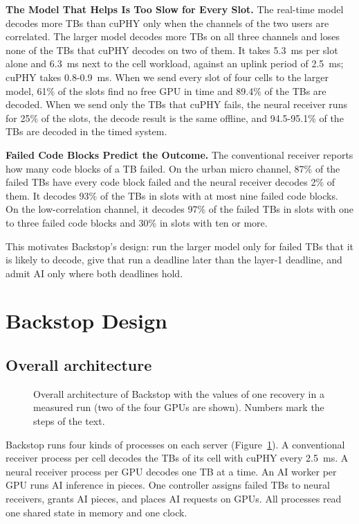 \documentclass[acmsmall,screen,review,anonymous]{acmart}
\newcommand{\sys}{Backstop\xspace}
\begin{document}
\noindent\textbf{The Model That Helps Is Too Slow for Every Slot.} The real-time model decodes more TBs
than cuPHY only when the channels of the two users are correlated. The larger model decodes more TBs on all
three channels and loses none of the TBs that cuPHY decodes on two of them. It takes 5.3~ms per slot alone
and 6.3~ms next to the cell workload, against an uplink period of 2.5~ms; cuPHY takes 0.8-0.9~ms. When we
send every slot of four cells to the larger model, 61\% of the slots find no free GPU in time and 89.4\% of
the TBs are decoded. When we send only the TBs that cuPHY fails, the neural receiver runs for 25\% of the
slots, the decode result is the same offline, and 94.5-95.1\% of the TBs are decoded in the timed system.

\noindent\textbf{Failed Code Blocks Predict the Outcome.} The conventional receiver reports how many code
blocks of a TB failed. On the urban micro channel, 87\% of the failed TBs have every code block failed and
the neural receiver decodes 2\% of them. It decodes 93\% of the TBs in slots with at most nine failed code
blocks. On the low-correlation channel, it decodes 97\% of the failed TBs in slots with one to three failed
code blocks and 30\% in slots with ten or more.

This motivates \sys's design: run the larger model only for failed TBs that it is likely to decode, give
that run a deadline later than the layer-1 deadline, and admit AI only where both deadlines hold.

\section{Backstop Design}

\subsection{Overall architecture}

\begin{figure}[t]
\centering
\resizebox{\linewidth}{!}{}
\caption{Overall architecture of \sys with the values of one recovery in a measured run (two of the four
GPUs are shown). Numbers mark the steps of the text.}
\label{fig:architecture}
\end{figure}

\sys runs four kinds of processes on each server (Figure~\ref{fig:architecture}). A conventional receiver
process per cell decodes the TBs of its cell with cuPHY every 2.5~ms. A neural receiver process per GPU
decodes one TB at a time. An AI worker per GPU runs AI inference in pieces. One controller assigns failed TBs
to neural receivers, grants AI pieces, and places AI requests on GPUs. All processes read one shared state
in memory and one clock.
\end{document}
